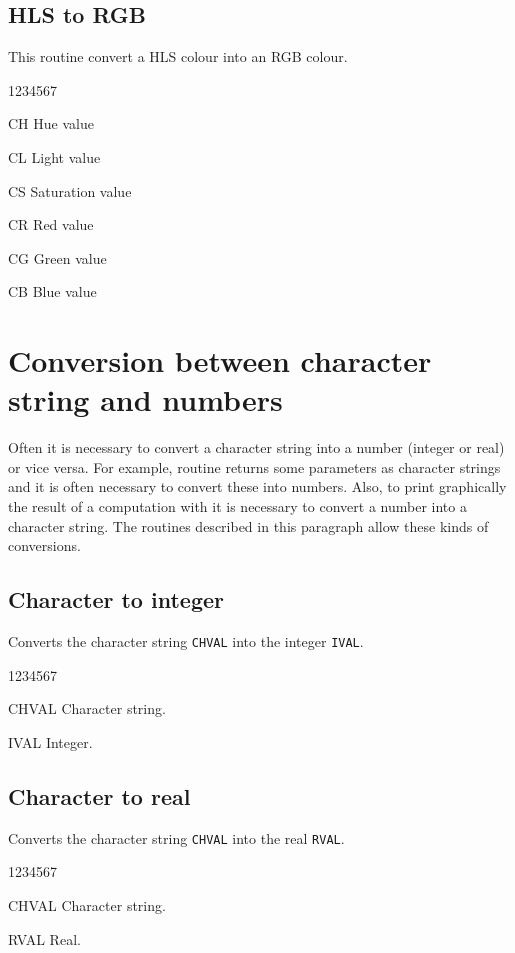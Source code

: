 \subsection{HLS to RGB}
\Action
This routine convert a HLS colour into an RGB colour.
\Pdesc
\begin{DLtt}{1234567}
\item[CH] Hue value 
\item[CL] Light value 
\item[CS] Saturation value 
\item[CR] Red value 
\item[CG] Green value 
\item[CB] Blue value 
\end{DLtt}

\newpage
 
\section{Conversion between character string and numbers}

Often it is necessary to convert a \FORTRAN{} character string into
a number (integer or real) or vice versa. For example, routine 
returns some parameters as character strings and it is often necessary to convert
these into numbers. 
Also, to print graphically the result of a computation with
 it is necessary to convert a number into a character string. 
The routines described in this paragraph allow these kinds of conversions.

\subsection{Character to integer}
\Action
Converts the character string {\tt CHVAL} into the integer {\tt IVAL}.
\Pdesc
\begin{DLtt}{1234567}
\item[CHVAL] Character string.
\item[IVAL] Integer.
\end{DLtt}

\subsection{Character to real}
\Action
Converts the character string {\tt CHVAL} into the real {\tt RVAL}.
\Pdesc
\begin{DLtt}{1234567}
\item[CHVAL] Character string.
\item[RVAL] Real.
\end{DLtt}
